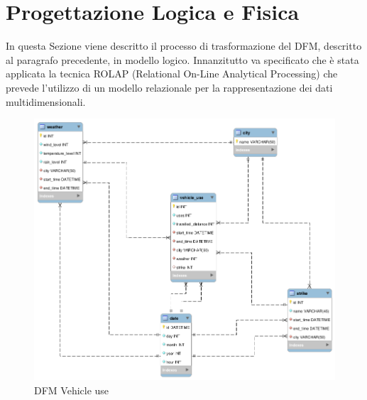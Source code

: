 \section{Progettazione Logica e Fisica}
In questa Sezione viene descritto il processo di trasformazione del DFM, descritto al paragrafo precedente, in modello logico. 
Innanzitutto va specificato che è stata applicata la tecnica ROLAP (Relational On-Line Analytical Processing) che prevede l’utilizzo di un
modello relazionale per la rappresentazione dei dati multidimensionali.

\begin{figure}[H]                                                                                                                                                            
\centering                                                                                                                                                                   
\includegraphics[width=\textwidth]{diagrams/logic}                                                                                                                                   
\caption{DFM Vehicle use}                                                                                                                                            
\label{fig:logic}                                                                                                                                                           
\end{figure}
